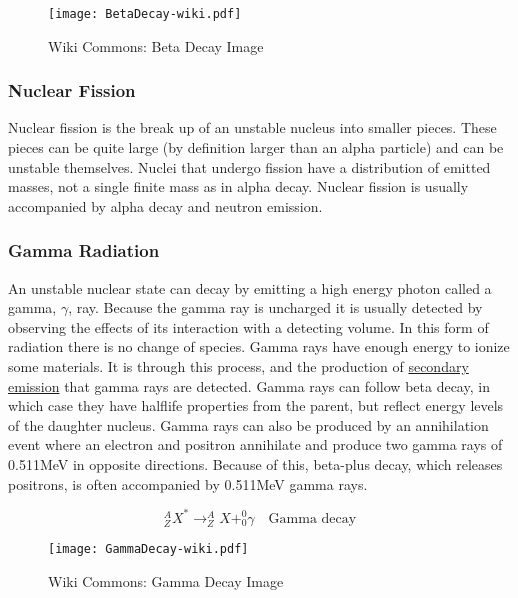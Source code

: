 \documentclass[12pt]{article}
\begin{document}
\begin{doublespacing}
\begin{figure}[!h]
    \centering
    \texttt{[image: BetaDecay-wiki.pdf]}
    \caption{Wiki Commons: Beta Decay Image} %
    \label{fig:Betadecay}
\end{figure}

\subsubsection{Nuclear Fission}
Nuclear fission is the break up of an unstable nucleus into smaller pieces. These pieces can be quite large (by definition larger than an alpha particle) and can be unstable themselves. Nuclei that undergo fission have a distribution of emitted masses, not a single finite mass as in alpha decay. Nuclear fission is usually accompanied by alpha decay and neutron emission.

\subsubsection{Gamma Radiation}
An unstable nuclear state can decay by emitting a high energy photon called a gamma, $\gamma$, ray. Because the gamma ray is uncharged it is usually detected by observing the effects of its interaction with a detecting volume. In this form of radiation there is no change of species. 
Gamma rays have enough energy to ionize some materials. It is through this process, and the production of \href{https://en.wikipedia.org/wiki/Secondary_emmission}{secondary emission} that gamma rays are detected. Gamma rays can follow beta decay, in which case they have halflife properties from the parent, but reflect energy levels of the daughter nucleus.
Gamma rays can also be produced by an annihilation event where an electron and positron annihilate and produce two gamma rays of 0.511MeV in opposite directions. Because of this, beta-plus decay, which releases positrons, is often accompanied by 0.511MeV gamma rays.

\begin{equation} \label{gammaDecayEqn}
^A_Z X^* \rightarrow ^{A}_{Z}X + ^0_0\gamma \quad \mbox{Gamma decay}
\end{equation}

\begin{figure}[!h]
    \centering
    \texttt{[image: GammaDecay-wiki.pdf]}
    \caption{Wiki Commons: Gamma Decay Image} %
    \label{fig:Gammadecay}
\end{figure}


\end{doublespacing}
\end{document}
